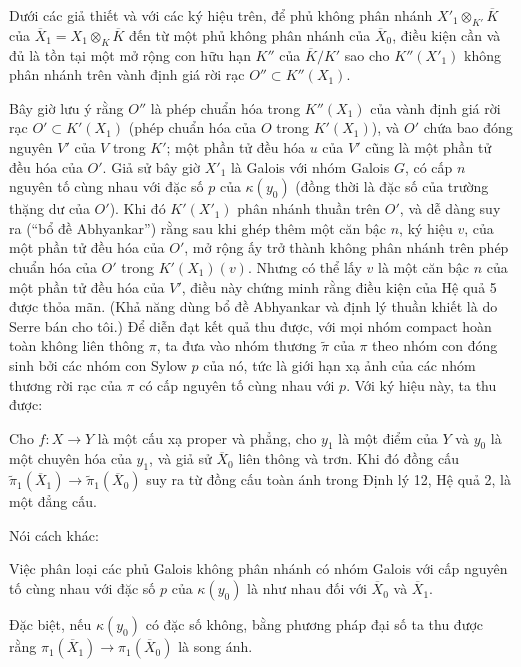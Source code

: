  Dưới các giả thiết và với các ký hiệu trên, để phủ không
phân nhánh $X'_1\otimes_{K'}\overline K$ của
$\overline X_1=X_1\otimes_K\overline K$ đến từ một phủ không phân nhánh của
$\overline X_0$, điều kiện cần và đủ là tồn tại một mở rộng con hữu hạn $K''$
của $\overline K/K'$ sao cho $K''(X'_1)$ không phân nhánh trên vành định giá
rời rạc $O''\subset K''(X_1)$.

Bây giờ lưu ý rằng $O''$ là phép chuẩn hóa trong $K''(X_1)$ của vành định giá
rời rạc $O'\subset K'(X_1)$ (phép chuẩn hóa của $O$ trong $K'(X_1)$), và
$O'$ chứa bao đóng nguyên $V'$ của $V$ trong $K'$; một phần tử đều hóa $u$ của
$V'$ cũng là một phần tử đều hóa của $O'$. Giả sử bây giờ $X'_1$ là Galois với
nhóm Galois $G$, có cấp $n$ nguyên tố cùng nhau với đặc số $p$ của
$\kappa(y_0)$ (đồng thời là đặc số của trường thặng dư của $O'$). Khi đó
$K'(X'_1)$ phân nhánh thuần trên $O'$, và dễ dàng suy ra (“bổ đề Abhyankar”)
rằng sau khi ghép thêm một căn bậc $n$, ký hiệu $v$, của một phần tử đều hóa
của $O'$, mở rộng ấy trở thành không phân nhánh trên phép chuẩn hóa của $O'$
trong $K'(X_1)(v)$. Nhưng có thể lấy $v$ là một căn bậc $n$ của một phần tử
đều hóa của $V'$, điều này chứng minh rằng điều kiện của Hệ quả 5 được thỏa
mãn. (Khả năng dùng bổ đề Abhyankar và định lý thuần khiết là do Serre bán cho
tôi.) Để diễn đạt kết quả thu được, với mọi nhóm compact hoàn toàn không liên
thông $\pi$, ta đưa vào nhóm thương $\widetilde\pi$ của $\pi$ theo nhóm con
đóng sinh bởi các nhóm con Sylow $p$ của nó, tức là giới hạn xạ ảnh của các
nhóm thương rời rạc của $\pi$ có cấp nguyên tố cùng nhau với $p$. Với ký hiệu
này, ta thu được:

 Cho $f:X\longrightarrow Y$ là một cấu xạ proper và
phẳng, cho $y_1$ là một điểm của $Y$ và $y_0$ là một chuyên hóa của $y_1$, và
giả sử $\overline X_0$ liên thông và trơn. Khi đó đồng cấu
$\widetilde\pi_1(\overline X_1)\longrightarrow
\widetilde\pi_1(\overline X_0)$ suy ra từ đồng cấu toàn ánh trong Định lý 12,
Hệ quả 2, là một đẳng cấu.

Nói cách khác:

 Việc phân loại các phủ Galois không phân nhánh có nhóm
Galois với cấp nguyên tố cùng nhau với đặc số $p$ của $\kappa(y_0)$ là như
nhau đối với $\overline X_0$ và $\overline X_1$.

Đặc biệt, nếu $\kappa(y_0)$ có đặc số không, bằng phương pháp đại số ta thu
được rằng $\pi_1(\overline X_1)\longrightarrow\pi_1(\overline X_0)$ là song
ánh.

